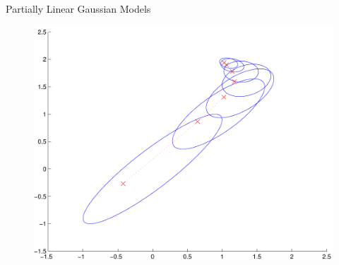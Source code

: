 \documentclass{beamer}
\begin{document}
\begin{frame}{Partially Linear Gaussian Models}
\begin{figure}
\centering
\includegraphics[width=0.5\columnwidth]{plg_oid_evolution.pdf}
\end{figure}
\end{frame}
\end{document}
